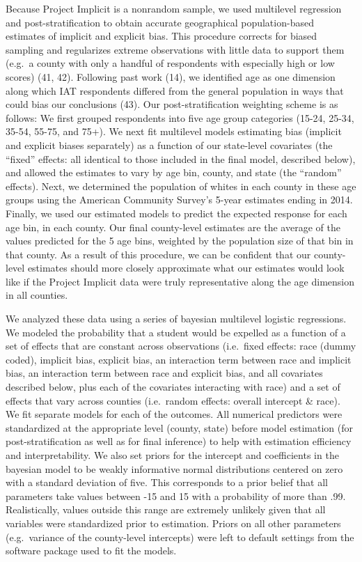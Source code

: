 \documentclass[9pt,twocolumn,twoside,lineno]{pnas-new}
\begin{document}
Because Project Implicit is a nonrandom sample, we used multilevel
regression and post-stratification to obtain accurate geographical
population-based estimates of implicit and explicit bias. This procedure
corrects for biased sampling and regularizes extreme observations with
little data to support them (e.g.~a county with only a handful of
respondents with especially high or low scores) (41, 42). Following past
work (14), we identified age as one dimension along which IAT
respondents differed from the general population in ways that could bias
our conclusions (43). Our post-stratification weighting scheme is as
follows: We first grouped respondents into five age group categories
(15-24, 25-34, 35-54, 55-75, and 75+). We next fit multilevel models
estimating bias (implicit and explicit biases separately) as a function
of our state-level covariates (the ``fixed'' effects: all identical to
those included in the final model, described below), and allowed the
estimates to vary by age bin, county, and state (the ``random''
effects). Next, we determined the population of whites in each county in
these age groups using the American Community Survey's 5-year estimates
ending in 2014. Finally, we used our estimated models to predict the
expected response for each age bin, in each county. Our final
county-level estimates are the average of the values predicted for the 5
age bins, weighted by the population size of that bin in that county. As
a result of this procedure, we can be confident that our county-level
estimates should more closely approximate what our estimates would look
like if the Project Implicit data were truly representative along the
age dimension in all counties.

We analyzed these data using a series of bayesian multilevel logistic
regressions. We modeled the probability that a student would be expelled
as a function of a set of effects that are constant across observations
(i.e.~fixed effects: race (dummy coded), implicit bias, explicit bias,
an interaction term between race and implicit bias, an interaction term
between race and explicit bias, and all covariates described below, plus
each of the covariates interacting with race) and a set of effects that
vary across counties (i.e.~random effects: overall intercept \& race).
We fit separate models for each of the outcomes. All numerical
predictors were standardized at the appropriate level (county, state)
before model estimation (for post-stratification as well as for final
inference) to help with estimation efficiency and interpretability. We
also set priors for the intercept and coefficients in the bayesian model
to be weakly informative normal distributions centered on zero with a
standard deviation of five. This corresponds to a prior belief that all
parameters take values between -15 and 15 with a probability of more
than .99. Realistically, values outside this range are extremely
unlikely given that all variables were standardized prior to estimation.
Priors on all other parameters (e.g.~variance of the county-level
intercepts) were left to default settings from the software package used
to fit the models.
\end{document}
